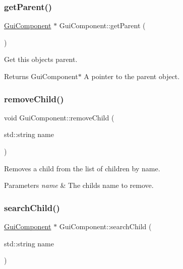 \subsubsection{\texorpdfstring{get\+Parent()}{getParent()}}
{\footnotesize\ttfamily \mbox{\hyperlink{class_gui_component}{Gui\+Component}} $\ast$ Gui\+Component\+::get\+Parent (\begin{DoxyParamCaption}{ }\end{DoxyParamCaption})}



Get this object\textquotesingle{}s parent. 

\begin{DoxyReturn}{Returns}
Gui\+Component$\ast$ A pointer to the parent object. 
\end{DoxyReturn}
\mbox{\label{class_gui_component_ac979fb459db6feda90bc7c11a6a60623}} 
\subsubsection{\texorpdfstring{remove\+Child()}{removeChild()}}
{\footnotesize\ttfamily void Gui\+Component\+::remove\+Child (\begin{DoxyParamCaption}\item[{std\+::string}]{name }\end{DoxyParamCaption})\hspace{0.3cm}{\ttfamily [virtual]}}



Removes a child from the list of children by name. 


\begin{DoxyParams}{Parameters}
{\em name} & The child\textquotesingle{}s name to remove. \\
\hline
\end{DoxyParams}
\mbox{\label{class_gui_component_a2167444f909f08b7be3805309d7ad831}} 
\subsubsection{\texorpdfstring{search\+Child()}{searchChild()}}
{\footnotesize\ttfamily \mbox{\hyperlink{class_gui_component}{Gui\+Component}} $\ast$ Gui\+Component\+::search\+Child (\begin{DoxyParamCaption}\item[{std\+::string}]{name }\end{DoxyParamCaption})\hspace{0.3cm}{\ttfamily [virtual]}}



